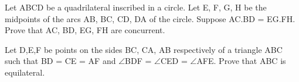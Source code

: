 \item Let ABCD be a quadrilateral inscribed in a circle. Let E, F, G, H be the midpoints of the arcs AB, BC, CD, DA of the circle. Suppose AC.BD = EG.FH. Prove that AC, BD, EG, FH are concurrent.

\item Let D,E,F be points on the sides BC, CA, AB respectively of a triangle ABC such that BD = CE = AF and
 $\angle$BDF = $\angle$CED = $\angle$AFE. Prove that ABC is equilateral.






















